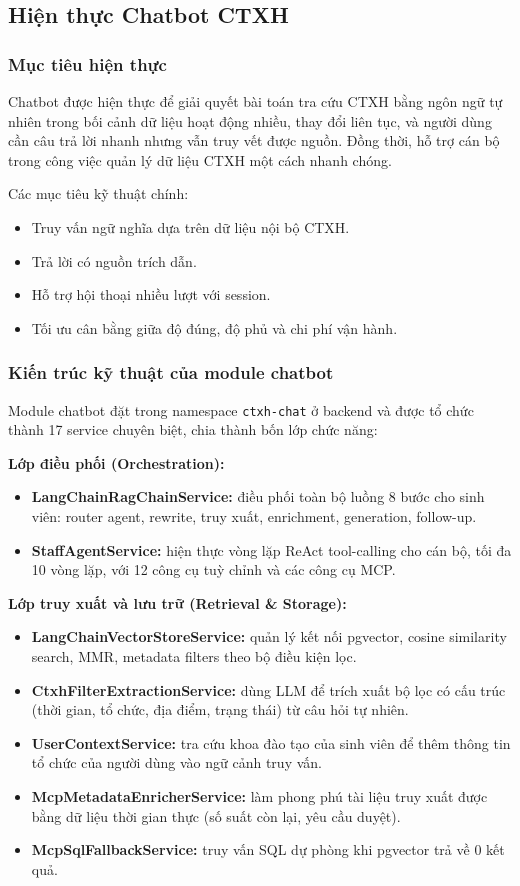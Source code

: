 \subsection{Hiện thực Chatbot CTXH}

\subsubsection{Mục tiêu hiện thực}
Chatbot được hiện thực để giải quyết bài toán tra cứu CTXH bằng ngôn ngữ tự nhiên trong bối cảnh dữ liệu hoạt động nhiều, thay đổi liên tục, và người dùng cần câu trả lời nhanh nhưng vẫn truy vết được nguồn. Đồng thời, hỗ trợ cán bộ trong công việc quản lý dữ liệu CTXH một cách nhanh chóng.

Các mục tiêu kỹ thuật chính:
\begin{itemize}
	\item Truy vấn ngữ nghĩa dựa trên dữ liệu nội bộ CTXH.
	\item Trả lời có nguồn trích dẫn.
	\item Hỗ trợ hội thoại nhiều lượt với session.
	\item Tối ưu cân bằng giữa độ đúng, độ phủ và chi phí vận hành.
\end{itemize}

\subsubsection{Kiến trúc kỹ thuật của module chatbot}
Module chatbot đặt trong namespace \texttt{ctxh-chat} ở backend và được tổ chức thành 17 service chuyên biệt, chia thành bốn lớp chức năng:

\textbf{Lớp điều phối (Orchestration):}
\begin{itemize}
	\item \textbf{LangChainRagChainService:} điều phối toàn bộ luồng 8 bước cho sinh viên: router agent, rewrite, truy xuất, enrichment, generation, follow-up.
	\item \textbf{StaffAgentService:} hiện thực vòng lặp ReAct tool-calling cho cán bộ, tối đa 10 vòng lặp, với 12 công cụ tuỳ chỉnh và các công cụ MCP.
\end{itemize}

\textbf{Lớp truy xuất và lưu trữ (Retrieval \& Storage):}
\begin{itemize}
	\item \textbf{LangChainVectorStoreService:} quản lý kết nối pgvector, cosine similarity search, MMR, metadata filters theo bộ điều kiện lọc.
	\item \textbf{CtxhFilterExtractionService:} dùng LLM để trích xuất bộ lọc có cấu trúc (thời gian, tổ chức, địa điểm, trạng thái) từ câu hỏi tự nhiên.
	\item \textbf{UserContextService:} tra cứu khoa đào tạo của sinh viên để thêm thông tin tổ chức của người dùng vào ngữ cảnh truy vấn.
	\item \textbf{McpMetadataEnricherService:} làm phong phú tài liệu truy xuất được bằng dữ liệu thời gian thực (số suất còn lại, yêu cầu duyệt).
	\item \textbf{McpSqlFallbackService:} truy vấn SQL dự phòng khi pgvector trả về 0 kết quả.
\end{itemize}

